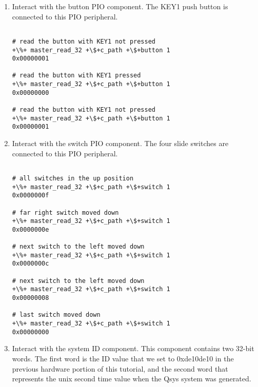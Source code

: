 \begin{flushleft}
\begin{enumerate}[
	label=\textbf{Step \arabic*.},
	leftmargin=*,
	widest={00},
	align=left]
\begin{enumerate}[
	label=\textbf{Step \arabic{enumi}\alph*.},
	leftmargin=*,
	align=left]
\begin{verbatim}

+\%+ jtag_debug_reset_system +\$+jb_path

\end{verbatim}

After executing that command, the LEDs should all turn off, returned to their reset state.  You can trigger the same reset effect by pressing the KEY0 push button like we did before.  Turn on some LEDs again and try pressing KEY0 to prove that as well.

\item Interact with the button PIO component.  The KEY1 push button is connected to this PIO peripheral.

\begin{verbatim}

# read the button with KEY1 not pressed
+\%+ master_read_32 +\$+c_path +\$+button 1
0x00000001

# read the button with KEY1 pressed
+\%+ master_read_32 +\$+c_path +\$+button 1
0x00000000

# read the button with KEY1 not pressed
+\%+ master_read_32 +\$+c_path +\$+button 1
0x00000001

\end{verbatim}

\item Interact with the switch PIO component.  The four slide switches are connected to this PIO peripheral.

\begin{verbatim}

# all switches in the up position
+\%+ master_read_32 +\$+c_path +\$+switch 1
0x0000000f

# far right switch moved down
+\%+ master_read_32 +\$+c_path +\$+switch 1
0x0000000e

# next switch to the left moved down
+\%+ master_read_32 +\$+c_path +\$+switch 1
0x0000000c

# next switch to the left moved down
+\%+ master_read_32 +\$+c_path +\$+switch 1
0x00000008

# last switch moved down
+\%+ master_read_32 +\$+c_path +\$+switch 1
0x00000000

\end{verbatim}

\item Interact with the system ID component.  This component contains two 32-bit words.  The first word is the ID value that we set to 0xde10de10 in the previous hardware portion of this tutorial, and the second word that represents the unix second time value when the Qsys system was generated.


\end{enumerate}
\end{enumerate}
\end{flushleft}
